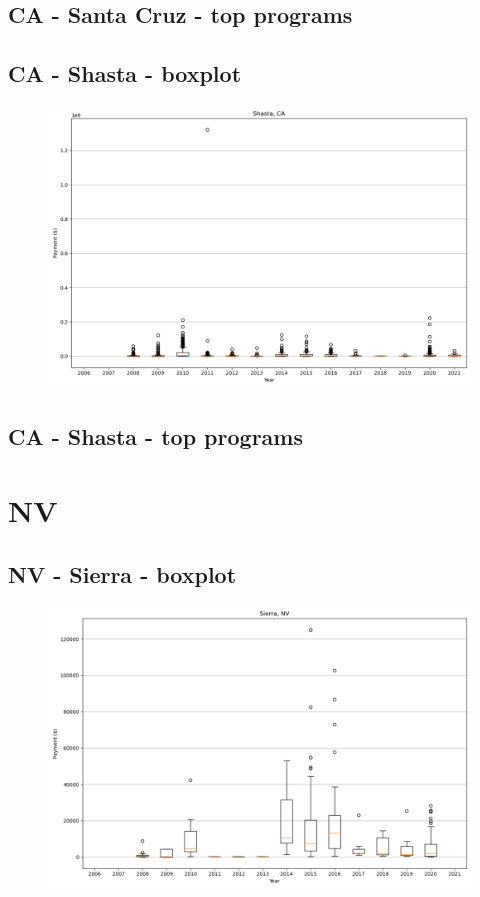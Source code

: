 \subsection*{CA - Santa Cruz - top programs}

\newpage
\subsection*{CA - Shasta - boxplot}
\begin{figure}[h]
\centering
\includegraphics[width=7in]{../output/boxplots/counties/Shasta-CA_boxplot.png}
\end{figure}


\subsection*{CA - Shasta - top programs}

\newpage
\section*{NV}
\subsection*{NV - Sierra - boxplot}
\begin{figure}[h]
\centering
\includegraphics[width=7in]{../output/boxplots/counties/Sierra-NV_boxplot.png}
\end{figure}


